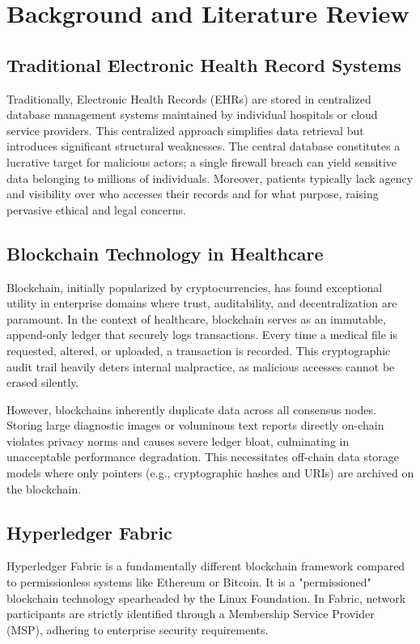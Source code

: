 \chapter{Background and Literature Review}

\section{Traditional Electronic Health Record Systems}
Traditionally, Electronic Health Records (EHRs) are stored in centralized database management systems maintained by individual hospitals or cloud service providers. This centralized approach simplifies data retrieval but introduces significant structural weaknesses. The central database constitutes a lucrative target for malicious actors; a single firewall breach can yield sensitive data belonging to millions of individuals. Moreover, patients typically lack agency and visibility over who accesses their records and for what purpose, raising pervasive ethical and legal concerns.

\section{Blockchain Technology in Healthcare}
Blockchain, initially popularized by cryptocurrencies, has found exceptional utility in enterprise domains where trust, auditability, and decentralization are paramount. In the context of healthcare, blockchain serves as an immutable, append-only ledger that securely logs transactions. Every time a medical file is requested, altered, or uploaded, a transaction is recorded. This cryptographic audit trail heavily deters internal malpractice, as malicious accesses cannot be erased silently. 

However, blockchains inherently duplicate data across all consensus nodes. Storing large diagnostic images or voluminous text reports directly on-chain violates privacy norms and causes severe ledger bloat, culminating in unacceptable performance degradation. This necessitates off-chain data storage models where only pointers (e.g., cryptographic hashes and URIs) are archived on the blockchain.

\section{Hyperledger Fabric}
Hyperledger Fabric is a fundamentally different blockchain framework compared to permissionless systems like Ethereum or Bitcoin. It is a "permissioned" blockchain technology spearheaded by the Linux Foundation. In Fabric, network participants are strictly identified through a Membership Service Provider (MSP), adhering to enterprise security requirements.

